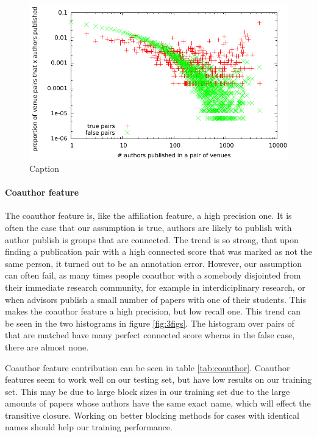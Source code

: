 \documentclass[twocolumn,letterpaper]{article}
\begin{document}
\begin{figure}
  \centering
  \includegraphics[width=\columnwidth]{venuestat_dataset}
  \caption{Caption}
  \label{fig:venuedataset}
\end{figure}

\paragraph{Coauthor feature} %
\label{par:coauthor_feature}
The coauthor feature is, like the affiliation feature, a high precision one. It is often the case that our assumption is true, authors are likely to publish with author publish is groups that are connected. The trend is so strong, that upon finding a publication pair with a high connected score that was marked as not the same person, it turned out to be an annotation error. However, our assumption can often fail, as many times people coauthor with a somebody disjointed from their immediate research community, for example in interdiciplinary research, or when advisors publish a small number of papers with one of their students. This makes the coauthor feature a high precision, but low recall one. This trend can be seen in the two histograms in figure \ref{fig:3figs}. The histogram over pairs of that are matched have many perfect connected score wheras in the false case, there are almost none. 

Coauthor feature contribution can be seen in table \ref{tab:coauthor}. Coauthor features seem to work well on our testing set, but have low results on our training set. This may be due to large block sizes in our training set due to the large amounts of papers whose authors have the same exact name, which will effect the transitive closure. Working on better blocking methods for cases with identical names should help our training performance.
\end{document}

